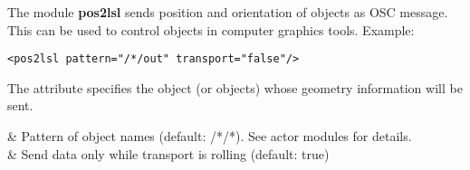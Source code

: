 The module {\bf pos2lsl} sends position and orientation of \tascar{}
objects as OSC message. This can be used to control objects in
computer graphics tools. Example:
\begin{lstlisting}[numbers=none]
<pos2lsl pattern="/*/out" transport="false"/>
\end{lstlisting}
The  attribute specifies the object (or objects) whose geometry information will be sent.
%

\begin{tscattributes}
   & Pattern of \tascar{} object names (default: /*/*). See actor modules for details. \\
 & Send data only while transport is rolling (default: true)                         \\
\end{tscattributes}

